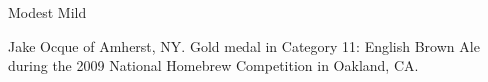\begin{recipe}{Modest Mild} %

\begin{aboutblock}
Jake Ocque of Amherst, NY. Gold medal in Category 11: English Brown Ale during
the 2009 National Homebrew Competition in Oakland, CA.
\sourceaha
\end{aboutblock}


\begin{methodandtiming}

\begin{mashsteps}
\end{mashsteps}

\begin{fermentationsteps}
\end{fermentationsteps}

\end{methodandtiming}

\recipebreak

\begin{ingredientsblock}

\begin{malts}
\end{malts}

\begin{hops}
\end{hops}


\end{ingredientsblock}

\end{recipe}

